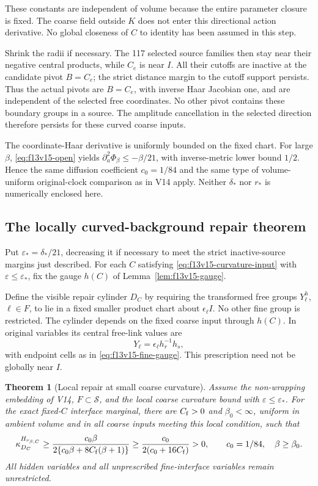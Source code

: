 \documentclass[11pt,oneside]{article}
\newtheorem{theorem}{Theorem}[section]
\begin{document}
These constants are independent
of volume because the entire
parameter closure is fixed.
The coarse field outside \(K\)
does not enter this directional
action derivative. No global
closeness of \(C\) to identity
has been assumed in this step.

Shrink the radii if necessary.
The 117 selected source families
then stay near their negative
central products, while \(C_e\)
is near \(I\). All their
cutoffs are inactive at the
candidate pivot \(B=C_e\);
the strict distance margin to
the cutoff support persists.
Thus the actual pivots are
\(B=C_e\), with inverse Haar
Jacobian one, and are independent
of the selected free coordinates.
No other pivot contains these
boundary groups in a source.
The amplitude cancellation in
the selected direction therefore
persists for these curved
coarse inputs.

The coordinate-Haar derivative
is uniformly bounded on the
fixed chart. For large \(\beta\),
\eqref{eq:f13v15-open} yields
\(\partial_a^2\Phi_\beta\le
-\beta/21\), with inverse-metric
lower bound \(1/2\). Hence the
same diffusion coefficient
\(c_0=1/84\) and the same
type of volume-uniform
original-clock comparison as
in V14 apply. Neither
\(\delta_*\) nor \(r_*\) is
numerically enclosed here.

\subsection{The locally curved-background repair theorem}

Put \(\varepsilon_*=\delta_*/21\),
decreasing it if necessary to
meet the strict inactive-source
margins just described. For
each \(C\) satisfying
\eqref{eq:f13v15-curvature-input}
with \(\varepsilon\le
\varepsilon_*\), fix the
gauge \(h(C)\) of
Lemma~\ref{lem:f13v15-gauge}.

Define the visible repair
cylinder \(D_C\) by requiring
the transformed free groups
\(Y_\ell^h\), \(\ell\in F\),
to lie in a fixed smaller
product chart about
\(\epsilon_\ell I\).
No other fine group is
restricted. The cylinder
depends on the fixed coarse
input through \(h(C)\).
In original variables its
central free-link values are
\[
                   Y_\ell=\epsilon_\ell h_r^{-1}h_s,
\]
with endpoint cells as in
\eqref{eq:f13v15-fine-gauge}.
This prescription need not
be globally near \(I\).

\begin{theorem}[Local repair at small coarse curvature]
\label{thm:f13v15-floor}
Assume the non-wrapping embedding
of V14, \(F\subset\mathcal S\),
and the local coarse curvature
bound with
\(\varepsilon\le\varepsilon_*\).
For the exact fixed-\(C\)
interface marginal, there are
\(C_{\rm f}>0\) and
\(\beta_0<\infty\), uniform in
ambient volume and in all
coarse inputs meeting this
local condition, such that
\[
 \kappa_{D_C}^{H_{\nu_{\beta,C}}}
 \ge\frac{c_0\beta}
        {2\{c_0\beta+8C_{\rm f}(\beta+1)\}}
 \ge\frac{c_0}{2(c_0+16C_{\rm f})}>0,
 \qquad c_0=1/84,\quad\beta\ge\beta_0 .
\]
All hidden variables and all
unprescribed fine-interface
variables remain unrestricted.
\end{theorem}
\end{document}
